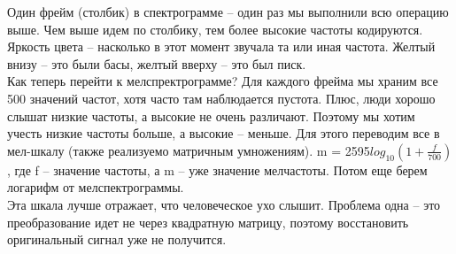 Один фрейм (столбик) в спектрограмме -- один раз мы выполнили всю операцию выше. Чем выше идем по столбику, тем более высокие частоты кодируются. Яркость цвета -- насколько в этот момент звучала та или иная частота. Желтый внизу -- это были басы, желтый вверху -- это был писк. \\ 

Как теперь перейти к мелспректрограмме? Для каждого фрейма мы храним все 500 значений частот, хотя часто там наблюдается пустота. Плюс, люди хорошо слышат низкие частоты, а высокие не очень различают. Поэтому мы хотим учесть низкие частоты больше, а высокие -- меньше. Для этого переводим все в мел-шкалу (также реализуемо матричным умножениям). m = 2595$log_{10}(1 + \frac{f}{700})$, где f -- значение частоты, а m -- уже значение мелчастоты. Потом еще берем логарифм от мелспектрограммы. \\ 

Эта шкала лучше отражает, что человеческое ухо слышит. Проблема одна -- это преобразование идет не через квадратную матрицу, поэтому восстановить оригинальный сигнал уже не получится. 
